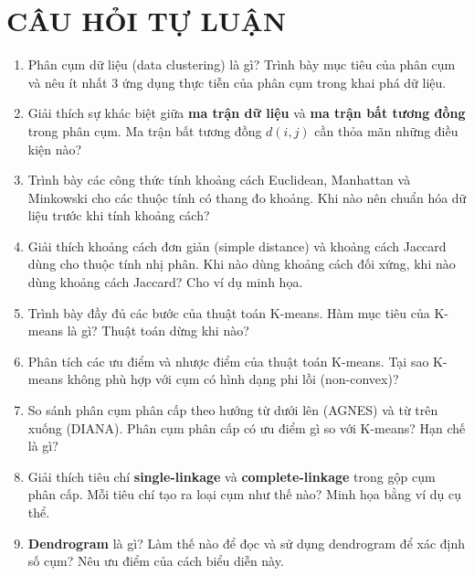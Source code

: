 \documentclass[10pt]{article}
\begin{document}
\newpage
\section{CÂU HỎI TỰ LUẬN}

\begin{enumerate}[leftmargin=*, label=\textbf{Câu \arabic*.}]

    \item Phân cụm dữ liệu (data clustering) là gì? Trình bày mục tiêu của phân cụm và nêu ít nhất 3 ứng dụng thực tiễn của phân cụm trong khai phá dữ liệu.

    \item Giải thích sự khác biệt giữa \textbf{ma trận dữ liệu} và \textbf{ma trận bất tương đồng} trong phân cụm. Ma trận bất tương đồng $d(i,j)$ cần thỏa mãn những điều kiện nào?

    \item Trình bày các công thức tính khoảng cách Euclidean, Manhattan và Minkowski cho các thuộc tính có thang đo khoảng. Khi nào nên chuẩn hóa dữ liệu trước khi tính khoảng cách?

    \item Giải thích khoảng cách đơn giản (simple distance) và khoảng cách Jaccard dùng cho thuộc tính nhị phân. Khi nào dùng khoảng cách đối xứng, khi nào dùng khoảng cách Jaccard? Cho ví dụ minh họa.

    \item Trình bày đầy đủ các bước của thuật toán K-means. Hàm mục tiêu của K-means là gì? Thuật toán dừng khi nào?

    \item Phân tích các ưu điểm và nhược điểm của thuật toán K-means. Tại sao K-means không phù hợp với cụm có hình dạng phi lồi (non-convex)?

    \item So sánh phân cụm phân cấp theo hướng từ dưới lên (AGNES) và từ trên xuống (DIANA). Phân cụm phân cấp có ưu điểm gì so với K-means? Hạn chế là gì?

    \item Giải thích tiêu chí \textbf{single-linkage} và \textbf{complete-linkage} trong gộp cụm phân cấp. Mỗi tiêu chí tạo ra loại cụm như thế nào? Minh họa bằng ví dụ cụ thể.

    \item \textbf{Dendrogram} là gì? Làm thế nào để đọc và sử dụng dendrogram để xác định số cụm? Nêu ưu điểm của cách biểu diễn này.


\end{enumerate}
\end{document}
